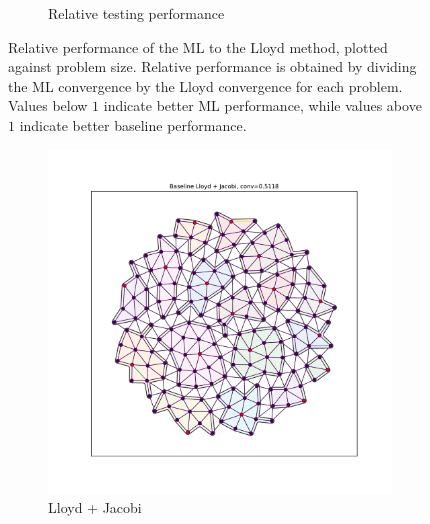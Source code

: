 \documentclass{article}
\begin{document}
\begin{figure}[h]
\begin{subfigure}[t]{0.49\textwidth}
    \caption{Relative testing performance}
  \end{subfigure}
  \caption{Relative performance of the ML to the Lloyd method, plotted against problem size.  Relative performance is obtained by dividing the ML convergence by the Lloyd convergence for each problem.  Values below $1$ indicate better ML performance, while values above $1$ indicate better baseline performance.}
  \label{fig:rel_conv}
\end{figure}

\begin{figure}[h]
  \centering
  \begin{subfigure}[t]{0.49\textwidth}
    \centering
    \includegraphics[width=\textwidth, trim=80 70 70 50, clip]{grid_circle_lloyd.pdf}
    \caption{Lloyd + Jacobi}
  \end{subfigure}
  \begin{subfigure}[t]{0.49\textwidth}
    \centering

\end{subfigure}
\end{figure}
\end{document}

